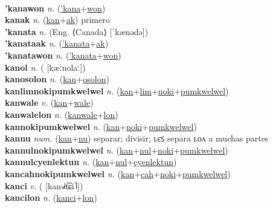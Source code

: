  \label{kanalum} \\
\textbf{'kanawon} \textit{n.} (\hyperref['kana]{'kana}+\hyperref[won]{won})
 \label{'kanawon} \\
\textbf{kanak} \textit{n.} (\hyperref[kan]{kan}+\hyperref[ak]{ak})
primero \label{kanak} \\
\textbf{'kanata} \textit{n.} (Eng. ⟨Canada⟩ [ˈkænədə])
 \label{'kanata} \\
\textbf{'kanataak} \textit{n.} (\hyperref['kanata]{'kanata}+\hyperref[ak]{ak})
 \label{'kanataak} \\
\textbf{'kanatawon} \textit{n.} (\hyperref['kanata]{'kanata}+\hyperref[won]{won})
 \label{'kanatawon} \\
\textbf{kanol} \textit{n.} ( [kæːnolaː])
 \label{kanol} \\
\textbf{kanosolon} \textit{n.} (\hyperref[kan]{kan}+\hyperref[osolon]{osolon})
 \label{kanosolon} \\
\textbf{kanlimnokipumkwelwel} \textit{n.} (\hyperref[kan]{kan}+\hyperref[lim]{lim}+\hyperref[noki]{noki}+\hyperref[pumkwelwel]{pumkwelwel})
 \label{kanlimnokipumkwelwel} \\
\textbf{kanwale} \textit{v.} (\hyperref[kan]{kan}+\hyperref[wale]{wale})
 \label{kanwale} \\
\textbf{kanwalelon} \textit{n.} (\hyperref[kanwale]{kanwale}+\hyperref[lon]{lon})
 \label{kanwalelon} \\
\textbf{kannokipumkwelwel} \textit{n.} (\hyperref[kan]{kan}+\hyperref[noki]{noki}+\hyperref[pumkwelwel]{pumkwelwel})
 \label{kannokipumkwelwel} \\
\textbf{kannu} \textit{num.} (\hyperref[kan]{kan}+\hyperref[nu]{nu})
separar; divisir; ʟєꜱ separa ʟᴏᴧ a muchas partes \label{kannu} \\
\textbf{kannulnokipumkwelwel} \textit{n.} (\hyperref[kan]{kan}+\hyperref[nul]{nul}+\hyperref[noki]{noki}+\hyperref[pumkwelwel]{pumkwelwel})
 \label{kannulnokipumkwelwel} \\
\textbf{kannulcyenlektun} \textit{n.} (\hyperref[kan]{kan}+\hyperref[nul]{nul}+\hyperref[cyenlektun]{cyenlektun})
 \label{kannulcyenlektun} \\
\textbf{kancahnokipumkwelwel} \textit{n.} (\hyperref[kan]{kan}+\hyperref[cah]{cah}+\hyperref[noki]{noki}+\hyperref[pumkwelwel]{pumkwelwel})
 \label{kancahnokipumkwelwel} \\
\textbf{kanci} \textit{v.} ( [kan˧˩˧t͡ɕi˥])
 \label{kanci} \\
\textbf{kancilon} \textit{n.} (\hyperref[kanci]{kanci}+\hyperref[lon]{lon})
